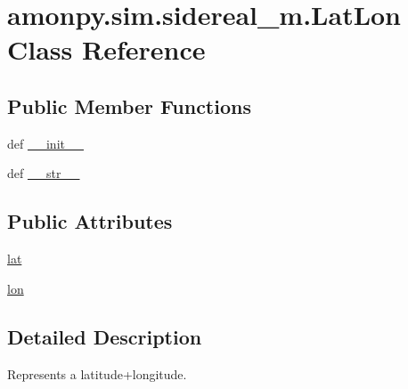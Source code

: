 \hypertarget{classamonpy_1_1sim_1_1sidereal__m_1_1_lat_lon}{\section{amonpy.\-sim.\-sidereal\-\_\-m.\-Lat\-Lon Class Reference}
\label{classamonpy_1_1sim_1_1sidereal__m_1_1_lat_lon}
}
\subsection*{Public Member Functions}
\begin{DoxyCompactItemize}
\item 
def \hyperlink{classamonpy_1_1sim_1_1sidereal__m_1_1_lat_lon_a28646e83585d4736392a2a292dff5a96}{\-\_\-\-\_\-init\-\_\-\-\_\-}
\item 
def \hyperlink{classamonpy_1_1sim_1_1sidereal__m_1_1_lat_lon_aafcec1fc1bf297d5e305abe49c139c79}{\-\_\-\-\_\-str\-\_\-\-\_\-}
\end{DoxyCompactItemize}
\subsection*{Public Attributes}
\begin{DoxyCompactItemize}
\item 
\hyperlink{classamonpy_1_1sim_1_1sidereal__m_1_1_lat_lon_a976255a27251aa9ba8c9f93d5969e0c5}{lat}
\item 
\hyperlink{classamonpy_1_1sim_1_1sidereal__m_1_1_lat_lon_ab3e5f72c3d32f4281fd3b373b2b4d17b}{lon}
\end{DoxyCompactItemize}


\subsection{Detailed Description}
\begin{DoxyVerb}Represents a latitude+longitude.
\end{DoxyVerb}
 

